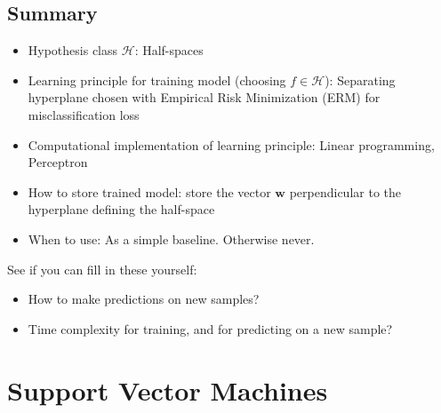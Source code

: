 \documentclass[11pt]{article}
\newcommand{\Hc}{\mathcal{H}}
\newcommand{\VV}[1]{\mathbf{#1}}
\begin{document}
\subsection{Summary}
\begin{itemize}
  \item Hypothesis class $\Hc$: Half-spaces
  \item Learning principle for training model (choosing $f\in\Hc$): Separating
    hyperplane chosen with Empirical Risk Minimization
    (ERM) for misclassification loss
  \item Computational implementation of learning principle: Linear programming, Perceptron
  \item How to store trained model: store the vector $\VV{w}$ perpendicular to
    the hyperplane defining the half-space  
  \item When to use: As a simple baseline. Otherwise never.
\end{itemize}


See if you can fill in these yourself:
\begin{itemize}
  \item How to make predictions on new samples?
  \item Time complexity for training, and for predicting on a new sample?

\end{itemize}

\section{Support Vector Machines}
\end{document}
